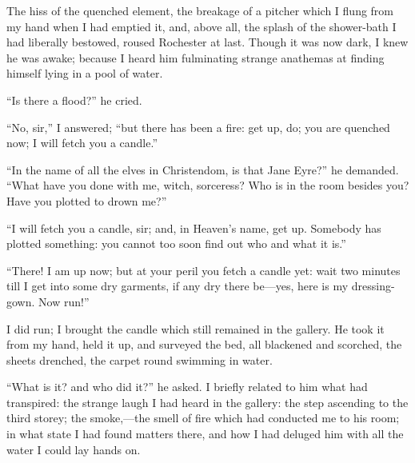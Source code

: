 The hiss of the quenched element, the breakage of a pitcher which I
flung from my hand when I had emptied it, and, above all, the splash of
the shower-bath I had liberally bestowed, roused \Mr{}  Rochester at last. 
Though it was now dark, I knew he was awake; because I heard him
fulminating strange anathemas at finding himself lying in a pool of
water.

\enquote{Is there a flood?} he cried.

\enquote{No, sir,} I answered; \enquote{but there has been a fire: get
up, do; you are quenched now; I will fetch you a candle.}

\enquote{In the name of all the elves in Christendom, is that Jane
Eyre?} he demanded. \enquote{What have you done with me, witch,
sorceress? Who is in the room besides you? Have you plotted to drown
me?}

\enquote{I will fetch you a candle, sir; and, in Heaven's name, get up. 
Somebody has plotted something: you cannot too soon find out who and
what it is.}

\enquote{There! I am up now; but at your peril you fetch a candle yet:
wait two minutes till I get into some dry garments, if any dry there
be---yes, here is my dressing-gown. Now run!}

I did run; I brought the candle which still remained in the gallery. He
took it from my hand, held it up, and surveyed the bed, all blackened
and scorched, the sheets drenched, the carpet round swimming in water.

\enquote{What is it? and who did it?} he asked. I briefly related to
him what had transpired: the strange laugh I had heard in the gallery:
the step ascending to the third storey; the smoke,---the smell of fire
which had conducted me to his room; in what state I had found matters
there, and how I had deluged him with all the water I could lay hands
on.

